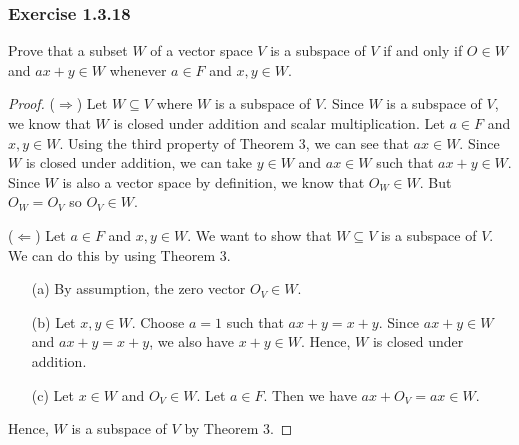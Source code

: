 \subsubsection{Exercise 1.3.18} Prove that a subset \( W  \) of a vector space \( V  \) is a subspace of \( V  \) if and only if \( O \in W  \) and \( ax + y \in W  \) whenever \( a \in F  \) and \( x,y \in W  \).
\begin{proof}
    (\( \Rightarrow \)) Let \( W \subseteq V  \) where \( W  \) is a subspace of \( V  \). Since \( W  \) is a subspace of \( V  \), we know that \( W  \) is closed under addition and scalar multiplication. Let \( a \in F  \) and \( x,y \in W  \). Using the third property of Theorem 3, we can see that \( ax \in W  \).  Since \( W  \) is closed under addition, we can take \( y \in W  \) and \( ax \in W \) such that \( ax + y \in W   \). Since \( W   \) is also a vector space by definition, we know that \( O_{W} \in W  \). But \( O_{W} = O_{V}  \) so \( O_{V} \in W  \).

    (\( \Leftarrow \)) Let \( a \in F  \) and \( x,y \in W  \). We want to show that \( W \subseteq V   \) is a subspace of \( V  \). We can do this by using Theorem 3.
    \begin{enumerate}
        \item[(a)] By assumption, the zero vector \( O_{V } \in W  \).
        \item[(b)] Let \( x,y \in W  \). Choose \( a = 1  \) such that  \( ax + y = x + y   \). Since \( ax + y \in W  \) and \( ax + y = x + y  \), we also have \( x + y \in W  \). Hence, \( W  \) is closed under addition. 
        \item[(c)] Let \( x \in W  \) and \( O_{V} \in W   \). Let \( a \in F  \). Then we have \( ax + O_{V} = ax \in W   \). 
    \end{enumerate}
    Hence, \( W  \) is a subspace of \( V  \) by Theorem 3.
\end{proof}
